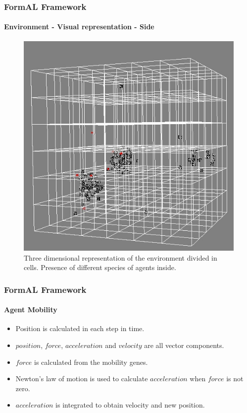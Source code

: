 \frame
{
	\frametitle{FormAL Framework}
	\framesubtitle{Environment - Visual representation - Side}

	\begin{figure}[H]
		\centering
		\includegraphics[scale=0.40]{../tex/images/cells-side}
		\caption{Three dimensional representation of the environment divided in cells. Presence of different species of agents inside.}
	\label{tab:3-d-environment-images-3}
	\end{figure}	
}

\frame
{
	\frametitle{FormAL Framework}
	\framesubtitle{Agent Mobility}
	
	\begin{itemize}
		\item Position is calculated in each step in time.
		\item \(position\), \(force\), \(acceleration\) and \(velocity\) are all vector components.
		\item \(force\) is calculated from the mobility genes.
		\item Newton's law of motion is used to calculate \(acceleration\) when \(force\) is not zero.
		\item \(acceleration\) is integrated to obtain velocity and new position.
	\end{itemize}

}

